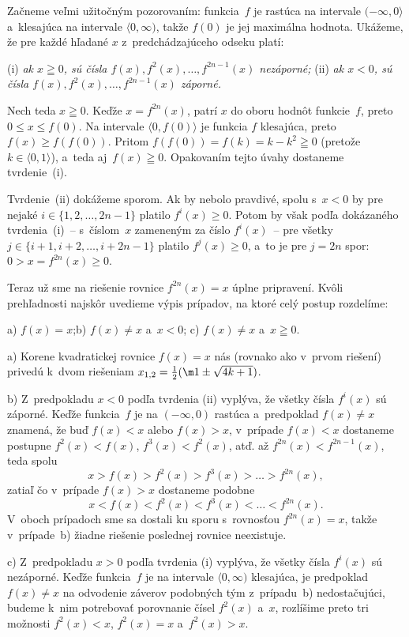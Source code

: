 {Začneme veľmi užitočným pozorovaním:
funkcia~$f$ je rastúca na intervale $({-\infty}, 0\rangle$
a~klesajúca na intervale $\langle0,\infty)$, takže $f(0)$ je jej
maximálna hodnota. Ukážeme, že pre každé hľadané $x$
z~predchádzajúceho odseku platí:

\medskip
\ite(i)
{\sl ak $x\geqq0$, sú čísla $f(x),f^2 (x),\dots,f^{2n-1}(x)$
nezáporné;}
\ite(ii)
{\sl ak $x<0$, sú čísla $f(x), f^2(x),\dots, f^{2n-1}(x)$
záporné.}

\medskip
Nech teda $x\geqq0$. Keďže $x = f^{2n} (x)$, patrí $x$ do oboru hodnôt funkcie~$f$, preto
$0 \le x \le f (0)$. Na intervale $\langle 0, f (0) \rangle$ je funkcia $f$
klesajúca, preto $f (x)\ge f (f (0))$.
Pritom $f(f(0))=f(k)=k-k^2\geqq0$ (pretože $k\in \langle 0,1 \rangle$),
a~teda aj~$f(x)\geqq0$. Opakovaním tejto úvahy dostaneme tvrdenie~(i).

Tvrdenie~(ii) dokážeme sporom. Ak by nebolo pravdivé,
spolu s~$x<0$ by pre nejaké $i\in\{1,2,\dots,2n-1\}$
platilo $f^i(x)\ge 0$. Potom by však podľa dokázaného tvrdenia~(i)~--
s~číslom~$x$ zameneným za číslo $f^i(x)$~--
pre všetky $j\in\{i+1,i+2,\dots,\allowbreak i+2n-1\}$
platilo $f^j (x) \ge 0$, a~to je pre $j = 2n$ spor:
$0>x=f^{2n}(x)\ge 0$.

\smallskip
Teraz už sme na riešenie rovnice $f^{2n} (x) = x$ úplne pripravení.
Kvôli prehľadnosti najskôr uvedieme výpis prípadov, na ktoré celý
postup rozdelíme:

a) $f(x)=x$;\quad b) $f(x)\ne x$ a~$ x<0$;\quad
c) $f(x)\ne x$ a~$ x\geqq0$.

\smallskip
a) Korene kvadratickej rovnice $f(x)=x$ nás (rovnako ako v~prvom
riešení) privedú k~dvom riešeniam $x_{1,2}=\frac12(\m1\pm\sqrt{4k+1})$.

\smallskip
b) Z~predpokladu $x<0$ podľa tvrdenia (ii)
vyplýva, že všetky čísla $f^i(x)$ sú
záporné. Keďže funkcia~$f$ je na $({-\infty},0)$ rastúca
a~predpoklad $f(x)\ne x$ znamená, že buď $f(x)<x$ alebo $f(x)>x$,
v~prípade $f(x)<x$ dostaneme postupne $f^2(x)<f(x)$,
$f^3(x)<f^2(x)$, atď. až $f^{2n}(x)<f^{2n-1}(x)$, teda spolu
$$
x>f(x)>f^2(x)>f^3(x)>\dots>f^{2n}(x),
$$
zatiaľ čo v~prípade $f(x)>x$ dostaneme podobne
$$
x<f(x)<f^2(x)<f^3(x)<\dots<f^{2n}(x).
$$
V~oboch prípadoch sme sa dostali ku sporu s~rovnosťou
$f^{2n}(x)=x$, takže v~prípade~b) žiadne riešenie poslednej rovnice
neexistuje.

\smallskip
c) Z~predpokladu $x>0$ podľa tvrdenia (i) vyplýva,
že všetky čísla $f^i(x)$ sú
nezáporné. Keďže funkcia~$f$ je na intervale $\langle0,\infty)$
klesajúca, je predpoklad $f(x)\ne x$ na odvodenie
záverov podobných tým z~prípadu~b) nedostačujúci, budeme k~nim
potrebovať porovnanie čísel $f^2(x)$ a~$x$, rozlíšime preto
tri možnosti $f^2(x)<x$, $f^2(x)=x$ a~$f^2(x)>x$.

}
